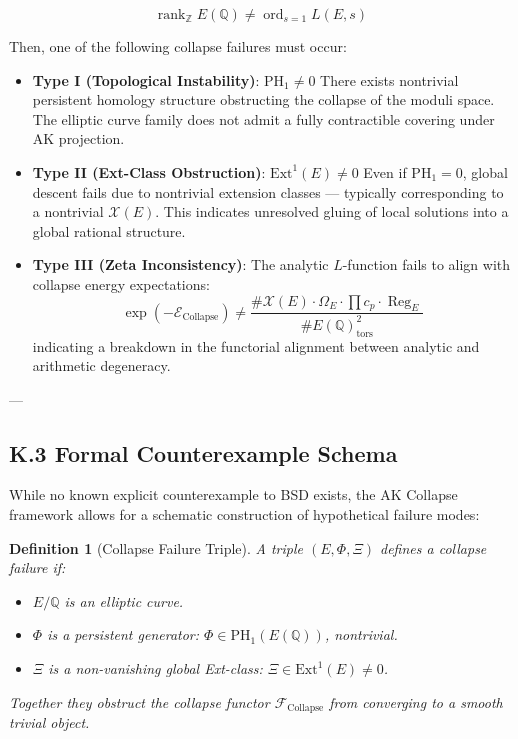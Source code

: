 \documentclass[11pt]{article}
\newtheorem{definition}[theorem]{Definition}
\newcommand{\Sha}{\mathcal{X}}
\begin{document}
\[
\operatorname{rank}_{\mathbb{Z}} E(\mathbb{Q}) \neq \operatorname{ord}_{s=1} L(E,s)
\]

Then, one of the following collapse failures must occur:

\begin{itemize}
  \item \textbf{Type I (Topological Instability)}: $\mathrm{PH}_1 \neq 0$  
  There exists nontrivial persistent homology structure obstructing the collapse of the moduli space. The elliptic curve family does not admit a fully contractible covering under AK projection.

  \item \textbf{Type II (Ext-Class Obstruction)}: $\mathrm{Ext}^1(E) \neq 0$  
  Even if $\mathrm{PH}_1 = 0$, global descent fails due to nontrivial extension classes — typically corresponding to a nontrivial $\Sha(E)$. This indicates unresolved gluing of local solutions into a global rational structure.

  \item \textbf{Type III (Zeta Inconsistency)}:  
  The analytic $L$-function fails to align with collapse energy expectations:
  \[
  \exp(-\mathcal{E}_{\text{Collapse}}) \neq \frac{\#\Sha(E)\cdot \Omega_E \cdot \prod c_p \cdot \operatorname{Reg}_E}{\# E(\mathbb{Q})_\text{tors}^2}
  \]
  indicating a breakdown in the functorial alignment between analytic and arithmetic degeneracy.
\end{itemize}

---

\subsection*{K.3 Formal Counterexample Schema}

While no known explicit counterexample to BSD exists, the AK Collapse framework allows for a schematic construction of hypothetical failure modes:

\begin{definition}[Collapse Failure Triple]
A triple $(E, \Phi, \Xi)$ defines a collapse failure if:
\begin{itemize}
  \item $E/\mathbb{Q}$ is an elliptic curve.
  \item $\Phi$ is a persistent generator: $\Phi \in \mathrm{PH}_1(E(\mathbb{Q}))$, nontrivial.
  \item $\Xi$ is a non-vanishing global Ext-class: $\Xi \in \mathrm{Ext}^1(E) \neq 0$.
\end{itemize}
Together they obstruct the collapse functor $\mathcal{F}_{\mathrm{Collapse}}$ from converging to a smooth trivial object.
\end{definition}
\end{document}

